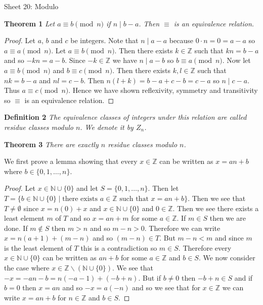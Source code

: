 \documentclass{article}
\begin{document}
\begin{flushleft}

\Large

Sheet 20: Modulo\newline

\normalsize

\textbf{Theorem 1}
\textsl{Let $a \equiv b \pmod{n}$ if $n \mid b-a$. Then $\equiv$ is an equivalence relation.}
\begin{proof}
Let $a$, $b$ and $c$ be integers. Note that $n \mid a-a$ because $0 \cdot n = 0 = a-a$ so $a \equiv a \pmod{n}$. Let $a \equiv b \pmod {n}$. Then there exists $k \in \mathbb{Z}$ such that $kn = b-a$ and so $-kn = a-b$. Since $-k \in \mathbb{Z}$ we have $n \mid a-b$ so $b \equiv a \pmod{n}$. Now let $a \equiv b \pmod{n}$ and $b \equiv c \pmod{n}$. Then there exists $k, l \in \mathbb{Z}$ such that $nk = b-a$ and $nl = c-b$. Then $n(l+k) = b-a+c-b = c-a$ so $n \mid c-a$. Thus $a \equiv c \pmod{n}$. Hence we have shown reflexivity, symmetry and transitivity so $\equiv$ is an equivalence relation.
\end{proof}

\textbf{Definition 2}
\textsl{The equivalence classes of integers under this relation are called residue classes modulo $n$. We denote it by $Z_n$.}\newline

\textbf{Theorem 3}
\textsl{There are exactly $n$ residue classes modulo $n$.}\newline

We first prove a lemma showing that every $x \in \mathbb{Z}$ can be written as $x=an+b$ where $b \in \{0, 1, \dots , n\}$.

\begin{proof}
Let $x \in \mathbb{N} \cup \{0\}$ and let $S=\{0, 1, \dots , n\}$. Then let $T=\{b \in \mathbb{N} \cup \{0\} \mid \text{there exists } a \in \mathbb{Z} \text{ such that } x = an+b\}$. Then we see that $T \neq \emptyset$ since $x = n(0) + x$ and $x \in \mathbb{N} \cup \{0\}$ and $0 \in \mathbb{Z}$. Then we see there exists a least element $m$ of $T$ and so $x=an+m$ for some $a \in \mathbb{Z}$. If $m \in S$ then we are done. If $m \notin S$ then $m > n$ and so $m - n > 0$. Therefore we can write $x=n(a+1)+(m-n)$ and so $(m-n) \in T$. But $m-n<m$ and since $m$ is the least element of $T$ this is a contradiction so $m \in S$. Therefore every $x \in \mathbb{N} \cup \{0\}$ can be written as $an+b$ for some $a \in \mathbb{Z}$ and $b \in S$. We now consider the case where $x \in \mathbb{Z} \backslash (\mathbb{N} \cup \{0\})$. We see that $-x = -an-b = n(-a-1) + (-b+n)$. But if $b \neq 0$ then $-b+n \in S$ and if $b=0$ then $x=an$ and so $-x=a(-n)$ and so we see that for $x \in \mathbb{Z}$ we can write $x=an+b$ for $n \in \mathbb{Z}$ and $b \in S$.
\end{proof}


\end{flushleft}
\end{document}
